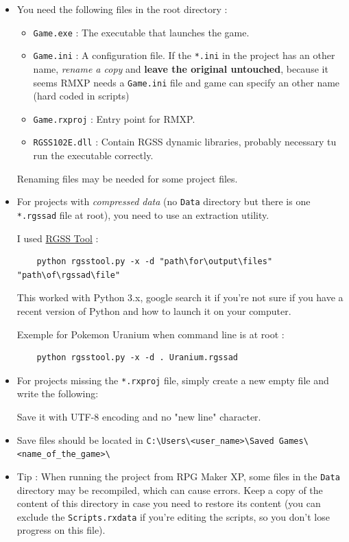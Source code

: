 \documentclass[11pt]{article}
\begin{document}
\begin{itemize}
	\item You need the following files in the root directory :
	
	\begin{itemize}
		\item \verb|Game.exe| : The executable that launches the game.
		\item \verb|Game.ini| : A configuration file. If the \verb|*.ini| in the project has an other name, \textit{rename a copy} and \textbf{leave the original untouched}, because it seems RMXP needs a \verb|Game.ini| file and game can specify an other name (hard coded in scripts)
		\item \verb|Game.rxproj| : Entry point for RMXP.
		\item \verb|RGSS102E.dll| : Contain RGSS dynamic libraries, probably necessary tu run the executable correctly.
	\end{itemize}
	
	Renaming files may be needed for some project files.
	
	\item For projects with \textit{compressed data} (no \verb|Data| directory but there is one \verb|*.rgssad| file at root), you need to use an extraction utility.
	
	I used \href{https://gitlab.com/rgss/rgsstool}{RGSS Tool} :
	
	\begin{lstlisting}
	python rgsstool.py -x -d "path\for\output\files" "path\of\rgssad\file"\end{lstlisting}
	\vspace{-8mm}
	
	This worked with Python 3.x, google search it if you're not sure if you have a recent version of Python and how to launch it on your computer.
	
	Exemple for Pokemon Uranium when command line is at root :
	
	\begin{lstlisting}
	python rgsstool.py -x -d . Uranium.rgssad\end{lstlisting}
	\vspace{-6mm}
	
	\item For projects missing the \verb|*.rxproj| file, simply create a new empty file and write the following: 
	
	
	Save it with UTF-8 encoding and no "new line" character.
	
	\item Save files should be located in \verb|C:\Users\<user_name>\Saved Games\<name_of_the_game>\|
	
	\item Tip : When running the project from RPG Maker XP, some files in the \verb|Data| directory may be recompiled, which can cause errors. Keep a copy of the content of this directory in case you need to restore its content (you can exclude the \verb|Scripts.rxdata| if you're editing the scripts, so you don't lose progress on this file).
\end{itemize}
\end{document}
